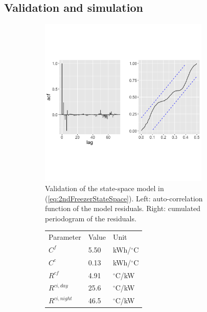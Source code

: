 \documentclass[11pt,a4paper]{article}
\begin{document}
\subsection{Validation and simulation}

\begin{figure}[!ht]
    \centering
    \begin{subfigure}[b]{.49\textwidth}
        \centering
        \includegraphics[width=0.89\textwidth]{figures/2ndFreezerModelValidation.png}
        \caption{Validation of the state-space model in (\ref{eq:2ndFreezerStateSpace}). Left: auto-correlation function of the model residuals. Right: cumulated periodogram of the residuals.}
        \label{fig:2ndFreezerModelValidation}
    \end{subfigure}
    \hfill
    \begin{subfigure}[b]{.49\textwidth}
        \centering
        \begin{tabular}[b]{|l|l|l|}
            \hline
            Parameter       & Value & Unit            \\ \hhline{|=|=|=|}
            $C^f$           & 5.50  & kWh/$^{\circ}$C \\
            $C^c$           & 0.13  & kWh/$^{\circ}$C \\
            $R^{cf}$        & 4.91  & $^{\circ}$C/kW  \\
            $R^{ci, day}$   & 25.6  & $^{\circ}$C/kW  \\
            $R^{ci, night}$ & 46.5  & $^{\circ}$C/kW  \\

\end{tabular}
\end{subfigure}
\end{figure}
\end{document}
